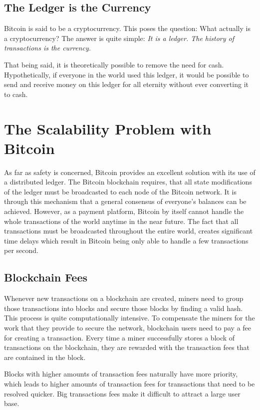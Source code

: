 \documentclass[a4paper, 12pt]{report}
\begin{document}
\section{The Ledger is the Currency}
\par Bitcoin is said to be a cryptocurrency. This poses the question: What actually is a cryptocurrency? The answer is quite simple: \textit{It is a ledger. The history of transactions is the currency.}
\par That being said, it is theoretically possible to remove the need for cash. Hypothetically, if everyone in the world used this ledger, it would be possible to send and receive money on this ledger for all eternity without ever converting it to cash.

\chapter{The Scalability Problem with Bitcoin}
\par As far as safety is concerned, Bitcoin provides an excellent solution with its use of a distributed ledger. The Bitcoin blockchain requires, that all state modifications of the ledger must be broadcasted to each node of the Bitcoin network. It is through this mechanism that a general consensus of everyone’s balances can be achieved. However, as a payment platform, Bitcoin by itself cannot handle the whole transactions of the world anytime in the near future. The fact that all transactions must be broadcasted throughout the entire world, creates significant time delays which result in Bitcoin being only able to handle a few transactions per second.

\section{Blockchain Fees}
\par Whenever new transactions on a blockchain are created, miners need to group those transactions into blocks and secure those blocks by finding a valid hash. This process is quite computationally intensive. To compensate the miners for the work that they provide to secure the network, blockchain users need to pay a fee for creating a transaction. Every time a miner successfully stores a block of transactions on the blockchain, they are rewarded with the transaction fees that are contained in the block. 
\par Blocks with higher amounts of transaction fees naturally have more priority, which leads to higher amounts of transaction fees for transactions that need to be resolved quicker. Big transactions fees make it difficult to attract a large user base.
\end{document}
